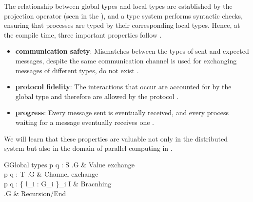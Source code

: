 The relationship between global types and local types are established by the projection operator (seen in the ), and a type system performs syntactic checks, ensuring that processes are typed by their corresponding local types. Hence, at the compile time, three important properties follow \cite{coppoGentleIntroductionMultiparty2015}. 
\begin{itemize}
  \item \textbf{communication safety}: Mismatches between the types of sent and expected messages, despite the same communication channel is used for exchanging messages of different types, do not exist \cite{coppoGentleIntroductionMultiparty2015}. 
  \item \textbf{protocol fidelity}: The interactions that occur are accounted for by the global type and therefore are allowed by the protocol \cite{coppoGentleIntroductionMultiparty2015}.
  \item \textbf{progress}: Every message sent is eventually received, and every process waiting for a message eventually receives one \cite{coppoGentleIntroductionMultiparty2015}.
\end{itemize}
We will learn that these properties are valuable not only in the distributed system but also in the domain of parallel computing in .
\begin{table}[ht]
\centering
\begin{grammar}{G\Coloneqq}{Global types}
  p \rightarrow q : \langle S \rangle.G & Value exchange \\
  p \rightarrow q : \langle T \rangle.G & Channel exchange \\
  p \rightarrow q : \{ l_i : G_i \}_{i \in I} & Bracnhing \\
  \mu {}.G  \mid {} \mid {} & Recursion/End
\end{grammar}
\caption{Global types} \label{b:mpst:gt}
\end{table}
